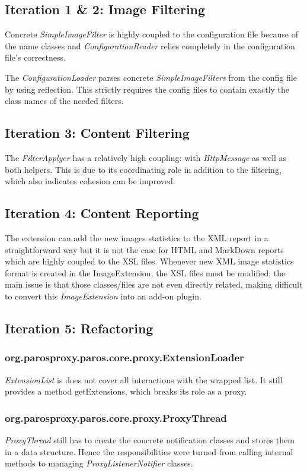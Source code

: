 \subsection{Iteration 1 \& 2: Image Filtering}
Concrete \textit{SimpleImageFilter}  is highly coupled to the configuration file because of the name classes and \textit{ConfigurationReader} relies completely in the configuration file’s correctness.

The \textit{ConfigurationLoader} parses concrete \textit{SimpleImageFilters} from the config file by using reflection. This strictly requires the config files to contain exactly the class names of the needed filters.
\subsection{Iteration 3: Content Filtering}
The \textit{FilterApplyer} has a relatively high coupling: with \textit{HttpMessage} as well as both helpers. This is due to its coordinating role in addition to the filtering, which also indicates cohesion can be improved.
\subsection{Iteration 4: Content Reporting}
The extension can add the new images statistics to the XML report in a straightforward way but it is not the case for HTML and MarkDown reports which are highly coupled to the XSL files. Whenever new XML image statistics format is created in the ImageExtension, the XSL files must be modified; the main issue is that those classes/files are not even directly related, making difficult to convert this \textit{ImageExtension} into an add-on plugin.

\subsection{Iteration 5: Refactoring}
\subsubsection{org.parosproxy.paros.core.proxy.ExtensionLoader}
\textit{ExtensionList} is does not cover all interactions with the wrapped list. It still provides a method getExtensions, which breaks its role as a proxy.
\subsubsection{org.parosproxy.paros.core.proxy.ProxyThread}

\textit{ProxyThread} still has to create the concrete notification classes and stores them in a data structure. Hence the responsibilities were turned from calling internal methods to managing \textit{ProxyListenerNotifier} classes.
